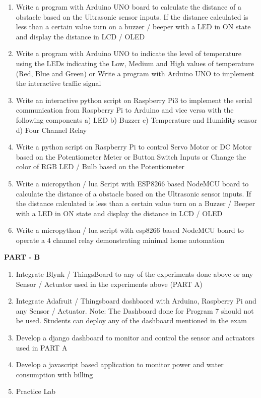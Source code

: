 \documentclass[12pt,a4paper]{article}
\begin{document}
\begin{enumerate}
\item Write a program with Arduino UNO board to calculate the distance of a obstacle based on the Ultrasonic sensor inputs. If the distance calculated is less than a certain value turn on a buzzer / beeper with a LED in ON state and display the distance in LCD / OLED 
\item Write a program with Arduino UNO to indicate the level of temperature using the LEDs indicating the Low, Medium and High values of temperature (Red, Blue and Green) or  Write a program with Arduino UNO to implement the interactive traffic signal 
\item Write an interactive python script on Raspberry Pi3 to implement the serial communication from Raspberry Pi to Arduino and vice versa with the following components \newline
a) LED \newline
b) Buzzer \newline
c) Temperature and Humidity sensor \newline
d) Four Channel Relay
\item Write a python script on Raspberry Pi to control Servo Motor or DC Motor based on the Potentiometer Meter or Button Switch Inputs or Change the color of RGB LED / Bulb based on the
Potentiometer
\item Write a micropython / lua Script with ESP8266 based NodeMCU board to calculate the distance of a obstacle based on the Ultrasonic sensor inputs. If the distance calculated is less than a certain value turn on a Buzzer / Beeper with a LED in ON state and display the distance in LCD / OLED
\item Write a micropython / lua script with esp8266 based NodeMCU board to operate a 4 channel relay demonstrating minimal home automation
\end{enumerate}
\begin{center}
\textbf{PART - B}
\end{center}\vspace{-0cm}
\begin{enumerate}
\item Integrate Blynk / ThingsBoard to any of the experiments done above or any Sensor / Actuator used in the experiments above (PART A)
\item Integrate Adafruit / Thingsboard dashbaord with Arduino,
Raspberry Pi and any Sensor / Actuator. \newline
Note: The Dashboard done for Program 7 should not be used. Students can deploy any of the dashboard mentioned in the exam
\item Develop a django dashboard to monitor and control the sensor and actuators used in PART A
\item Develop a javascript based application to monitor power and water consumption with billing
\item Practice Lab
\end{enumerate}
\end{document}
